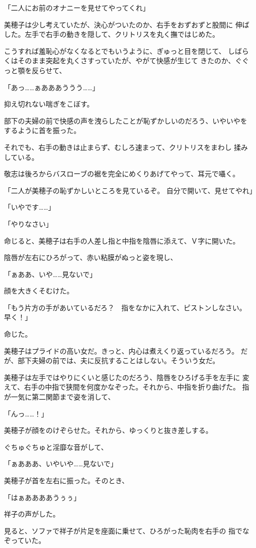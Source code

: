 ﻿\documentclass[
    book,tate,
    line_length=30zw,
    jafontsize=12pt,
    paper=b5j,
    landscape,
    ]{jlreq}
\begin{document}
「二人にお前のオナニーを見せてやってくれ」

美穂子は少し考えていたが、決心がついたのか、右手をおずおずと股間に
伸ばした。左手で右手の動きを隠して、クリトリスを丸く撫ではじめた。

こうすれば羞恥心がなくなるとでもいうように、ぎゅっと目を閉じて、
しばらくはそのまま突起を丸くさすっていたが、やがて快感が生じて
きたのか、ぐぐっと顎を反らせて、

「あっ……ぁあああううう……」

抑え切れない喘ぎをこぼす。

部下の夫婦の前で快感の声を洩らしたことが恥ずかしいのだろう、いやいやを
するように首を振った。

それでも、右手の動きは止まらず、むしろ速まって、クリトリスをまわし
揉みしている。

敬志は後ろからバスローブの裾を完全にめくりあげてやって、耳元で囁く。

「二人が美穂子の恥ずかしいところを見ているぞ。 自分で開いて、見せてやれ」

「いやです……」

「やりなさい」

命じると、美穂子は右手の人差し指と中指を陰唇に添えて、Ｖ字に開いた。

陰唇が左右にひろがって、赤い粘膜がぬっと姿を現し、

「ぁああ、いや……見ないで」

顔を大きくそむけた。

「もう片方の手があいているだろ？　指をなかに入れて、ピストンしなさい。
早く！」

命じた。

美穂子はプライドの高い女だ。きっと、内心は煮えくり返っているだろう。
だが、部下夫婦の前では、夫に反抗することはしない。そういう女だ。

美穂子は左手ではやりにくいと感じたのだろう、陰唇をひろげる手を左手に
変えて、右手の中指で狭間を何度かなぞった。それから、中指を折り曲げた。
指が一気に第二関節まで姿を消して、

「んっ……！」

美穂子が顔をのけぞらせた。それから、ゆっくりと抜き差しする。

ぐちゅぐちゅと淫靡な音がして、

「ぁあああ、いやいや……見ないで」

美穂子が首を左右に振った。そのとき、

「はぁああああうぅぅ」

祥子の声がした。

見ると、ソファで祥子が片足を座面に乗せて、ひろがった恥肉を右手の
指でなぞっていた。
\end{document}
